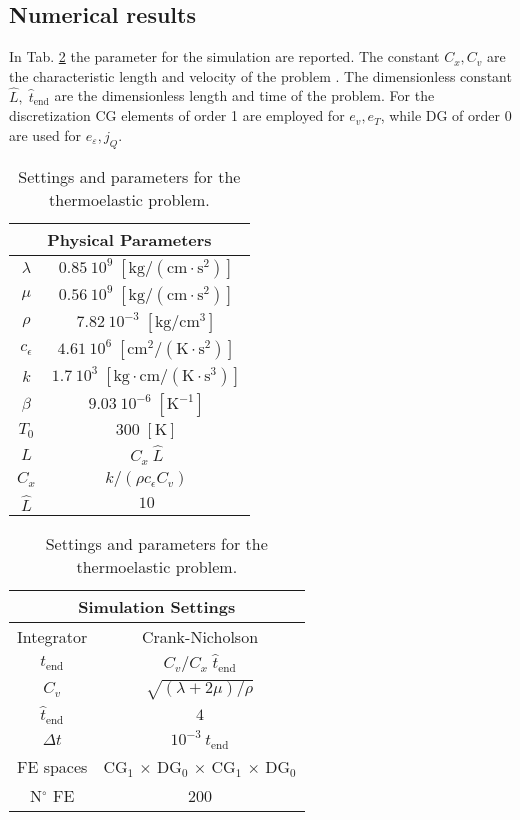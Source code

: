 \subsection{Numerical results}
In Tab. \ref{tab:parTherElas} the parameter for the simulation are reported. The constant $C_x, C_v$ are the characteristic length and velocity of the problem \cite{rabizadeh2016}. The dimensionless constant $\widehat{L}, \; \widehat{t}_{\text{end}}$ are the dimensionless length and time of the problem. For the discretization  CG elements of order 1 are employed for $e_v, e_T$, while DG of order 0 are used for $e_\varepsilon, j_Q$. 

\begin{table}[htb]
	\centering
	\begin{tabular}{|c|c|}
		\hline 
		\multicolumn{2}{|c|}{Physical Parameters} \\
		\hline 	
		$\lambda$ & $0.85\ 10^9 \; [\mathrm{kg/(cm\cdot s^2)}]$ \\ 
		$\mu$ & $0.56\ 10^9 \; [\mathrm{kg/(cm\cdot s^2)}]$ \\
		$\rho$ & $7.82\ 10^{-3} \; [\mathrm{kg}/\textrm{cm}^3]$ \\ 
		$c_\epsilon$ & $4.61\ 10^6 \; [\mathrm{cm^2/(K\cdot s^2)}]$ \\
		$k$ & $1.7\ 10^3 \; [\mathrm{kg \cdot cm/ (K\cdot s^3)}]$ \\ 
		$\beta$ & $9.03\ 10^{-6} \; [\mathrm{K}^{-1}]$ \\ 
		$T_0$ & $300 \; [\mathrm{K}]$ \\ 
		$L$ & $C_x \ \widehat{L}$ \\
		$C_x$ & ${k}/{(\rho c_\epsilon C_v)}$ \\
		$\widehat{L}$ & $10$ \\
		\hline 
	\end{tabular} \hspace{.5cm}
	\begin{tabular}{|c|c|}
		\hline 
		\multicolumn{2}{|c|}{Simulation Settings} \\ 
		\hline 
		Integrator & Crank-Nicholson\\
		$t_{\text{end}}$& ${C_v}/{C_x} \; \widehat{t}_{\text{end}}$ \\ 
		$C_v$ & $\sqrt{(\lambda + 2 \mu) / \rho}$ \\
		$\widehat{t}_{\text{end}}$ & $4$ \\
		$\Delta t$ & $10^{-3} \ t_{\text{end}}$ \\
		FE spaces& CG$_1$ $\times$ DG$_0$ $\times$ CG$_1$ $\times$ DG$_0$ \\
		N$^\circ$ FE & 200 \\
		\hline 
	\end{tabular} 
	\vspace{1mm}
	\caption{Settings and parameters for the thermoelastic problem.}
	\label{tab:parTherElas}
\end{table}

